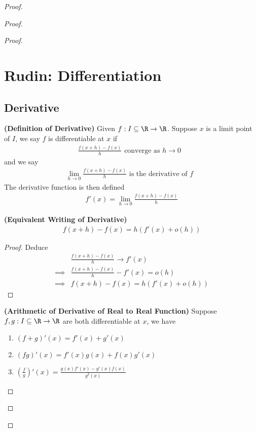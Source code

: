 \documentclass{report}
\begin{document}
\begin{proof}
\begin{proof}
\begin{proof}
\chapter{Rudin: Differentiation}
\section{Derivative}
\begin{definition}
\label{6.1.1}
\textbf{(Definition of Derivative)} Given $f:I\subseteq \R\rightarrow \R$. Suppose $x$ is a limit point of  $I$, we say  $f$ is differentiable at $x$ if 
 \begin{align*}
\frac{f(x+h)-f(x)}{h}\text{ converge as $h \to 0$ }
\end{align*}
and we say 
\begin{align*}
\lim_{h \to 0} \frac{f(x+h)-f(x)}{h}\text{ is the derivative of $f$ }
\end{align*}
The derivative function is then defined 
\begin{align*}
f'(x)=\lim_{h \to 0}\frac{f(x+h)-f(x)}{h}
\end{align*}
\end{definition}
\begin{theorem}
\label{6.1.2}
\textbf{(Equivalent Writing of Derivative)}
\begin{align*}
f(x+h)-f(x)=h(f'(x)+o(h))
\end{align*}
\end{theorem}
\begin{proof}
Deduce
\begin{align*}
&\frac{f(x+h)-f(x)}{h}\to f'(x)\\
\implies & \frac{f(x+h)-f(x)}{h}-f'(x) = o(h)\\
\implies &f(x+h)-f(x)=h(f'(x)+o(h))
\end{align*}
\end{proof}
\begin{theorem}
\label{6.1.3}
\textbf{(Arithmetic of Derivative of Real to Real Function)} Suppose $f,g:I\subseteq \R\rightarrow \R$ are both differentiable at $x$, we have 
\begin{enumerate}[label=(\alph*)]
  \item $ (f+g)'(x)=f'(x)+g'(x)$
  \item $(fg)'(x)=f'(x)g(x)+f(x)g'(x)$ 
  \item $(\frac{f}{g})'(x)=\frac{g(x)f'(x)-g'(x)f(x)}{g^2(x)}$

\end{enumerate}
\end{theorem}
\end{proof}
\end{proof}
\end{proof}
\end{document}

